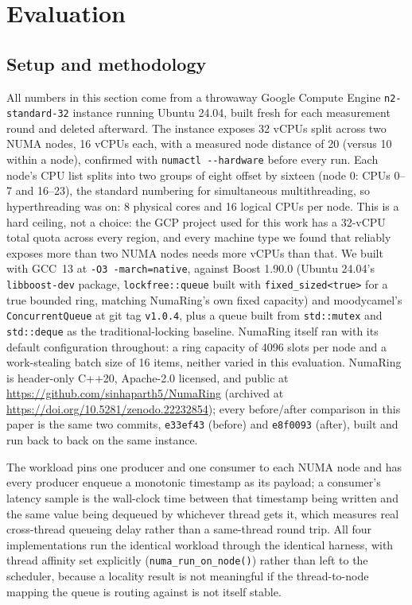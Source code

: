 \documentclass[10pt,journal,compsoc]{IEEEtran}
\begin{document}
\section{Evaluation}
\label{sec:eval}

\subsection{Setup and methodology}
\label{sec:eval-setup}

All numbers in this section come from a throwaway Google Compute Engine \texttt{n2-standard-32}
instance running Ubuntu 24.04, built fresh for each measurement round and deleted afterward. The
instance exposes 32 vCPUs split across two NUMA nodes, 16 vCPUs each, with a measured node distance
of 20 (versus 10 within a node), confirmed with \texttt{numactl -{}-hardware} before every run. Each
node's CPU list splits into two groups of eight offset by sixteen (node 0: CPUs 0--7 and 16--23),
the standard numbering for simultaneous multithreading, so hyperthreading was on: 8 physical cores
and 16 logical CPUs per node. This is a hard ceiling, not a choice: the GCP project used for this
work has a 32-vCPU total quota across every region, and every machine type we found that reliably
exposes more than two NUMA nodes needs more vCPUs than that. We built with GCC~13 at
\texttt{-O3 -march=native}, against Boost 1.90.0 (Ubuntu 24.04's \texttt{libboost-dev} package,
\texttt{lockfree::queue} built with \texttt{fixed\_sized<true>} for a true bounded ring, matching
NumaRing's own fixed capacity) and moodycamel's \texttt{ConcurrentQueue} at git tag \texttt{v1.0.4},
plus a queue built from \texttt{std::mutex} and \texttt{std::deque} as the traditional-locking
baseline. NumaRing itself ran with its default configuration throughout: a ring capacity of 4096
slots per node and a work-stealing batch size of 16 items, neither varied in this evaluation.
NumaRing is header-only C++20, Apache-2.0 licensed, and public at
\url{https://github.com/sinhaparth5/NumaRing} (archived at
\url{https://doi.org/10.5281/zenodo.22232854}); every before/after comparison in this paper is the
same two commits, \texttt{e33ef43} (before) and \texttt{e8f0093} (after), built and run back to
back on the same instance.

The workload pins one producer and one consumer to each NUMA node and has every producer enqueue a
monotonic timestamp as its payload; a consumer's latency sample is the wall-clock time between that
timestamp being written and the same value being dequeued by whichever thread gets it, which
measures real cross-thread queueing delay rather than a same-thread round trip. All four
implementations run the identical workload through the identical harness, with thread affinity set
explicitly (\texttt{numa\_run\_on\_node()}) rather than left to the scheduler, because a locality
result is not meaningful if the thread-to-node mapping the queue is routing against is not itself
stable.
\end{document}
